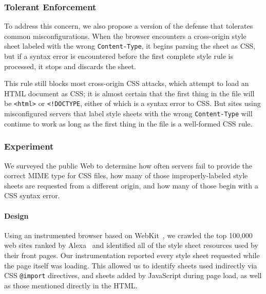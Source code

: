 \documentclass{acm_proc_article-sp}
\begin{document}
\subsubsection{Tolerant Enforcement}
To address this concern, we also propose a version of the defense that
tolerates common misconfigurations.  When the browser encounters a
cross-origin style sheet labeled with the wrong \verb|Content-Type|, it
begins parsing the sheet as CSS, but if a syntax error is encountered
before the first complete style rule is processed, it stops and
discards the sheet.

This rule still blocks most cross-origin CSS attacks, which attempt to
load an HTML document as CSS; it is almost certain that the first
thing in the file will be \verb|<html>| or \verb|<!DOCTYPE|, either of
which is a syntax error to CSS.  But sites using misconfigured servers
that label style sheets with the wrong \verb|Content-Type| will
continue to work as long as the first thing in the file is a
well-formed CSS rule.

\subsubsection{Experiment}
We surveyed the public Web to determine how often servers fail to
provide the correct MIME type for CSS files, how many of those
improperly-labeled style sheets are requested from a different origin,
and how many of those begin with a CSS syntax error.

\paragraph{Design}
Using an instrumented browser based on WebKit~\cite{webkit}, we
crawled the top 100,000 web sites ranked by Alexa~\cite{alexa} and
identified all of the style sheet resources used by their front pages.
Our instrumentation reported every style sheet requested while the
page itself was loading.  This allowed us to identify sheets used
indirectly via CSS \verb|@import| directives, and sheets added by
JavaScript during page load, as well as those mentioned directly in
the HTML.
\end{document}
